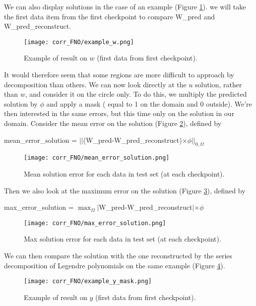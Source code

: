 We can also display solutions in the case of an example (Figure \ref{example_w}). we will take the first data item from the first checkpoint to compare W\_pred and W\_pred\_reconstruct.

\begin{figure}[H]
	\centering
	\texttt{[image: corr\_FNO/example\_w.png]}
	\caption{Example of result on $w$ (first data from first checkpoint).}
	\label{example_w}
\end{figure} 

It would therefore seem that some regions are more difficult to approach by decomposition than others. We can now look directly at the $u$ solution, rather than $w$, and consider it on the circle only. To do this, we multiply the predicted solution by $\phi$ and apply a mask ( equal to 1 on the domain and 0 outside). We're then interested in the same errors, but this time only on the solution in our domain. Consider the mean error on the solution (Figure \ref{mean_error_solution}), defined by
\begin{center}
	mean\_error\_solution = $||$(W\_pred-W\_pred\_reconstruct)$\times\phi||_{0,\Omega}$
\end{center}

\begin{figure}[H]
	\centering
	\texttt{[image: corr\_FNO/mean\_error\_solution.png]}
	\caption{Mean solution error for each data in test set (at each checkpoint).}
	\label{mean_error_solution}
\end{figure} 

Then we also look at the maximum error on the solution (Figure \ref{max_error_solution}), defined by
\begin{center}
	max\_error\_solution = $\max_\Omega|$W\_pred-W\_pred\_reconstruct$|\times\phi$
\end{center}

\begin{figure}[H]
	\centering
	\texttt{[image: corr\_FNO/max\_error\_solution.png]}
	\caption{Max solution error for each data in test set (at each checkpoint).}
	\label{max_error_solution}
\end{figure} 

We can then compare the solution with the one reconstructed by the series decomposition of Legendre polynomials on the same example (Figure \ref{example_y_mask}).
\begin{figure}[H]
	\centering
	\texttt{[image: corr\_FNO/example\_y\_mask.png]}
	\caption{Example of result on $y$ (first data from first checkpoint).}
	\label{example_y_mask}
\end{figure} 

